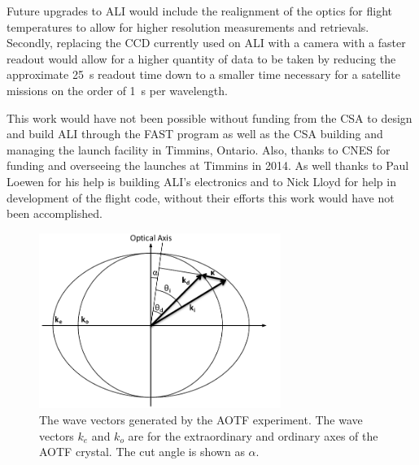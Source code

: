 \documentclass[12pt]{article}
\begin{document}
Future upgrades to ALI would include the realignment of the optics for flight temperatures to allow for higher resolution measurements and retrievals. Secondly, replacing the CCD currently used on ALI with a camera with a faster readout would allow for a higher quantity of data to be taken by reducing the approximate 25~s readout time down to a smaller time necessary for a satellite missions on the order of 1~s per wavelength.

This work would have not been possible without funding from the CSA to design and build ALI through the FAST program as well as the CSA building and managing the launch facility in Timmins, Ontario. Also, thanks to CNES for funding and overseeing the launches at Timmins in 2014. As well thanks to Paul Loewen for his help is building ALI's electronics and to Nick Lloyd for help in development of the flight code, without their efforts this work would have not been accomplished.




\newpage

\begin{figure}
    \begin{center}
    \includegraphics[width=0.7\textwidth]{./Images/3-1-AOTFWavevectorWithRefraction.pdf}
    \caption{The wave vectors generated by the AOTF experiment. The wave vectors $k_{e}$ and $k_{o}$ are for the extraordinary and ordinary axes of the AOTF crystal. The cut angle is shown as $\alpha$.}
    \label{fig:3.1:ATOFWavevectors}
    \end{center}
\end{figure}

\newpage
\end{document}
